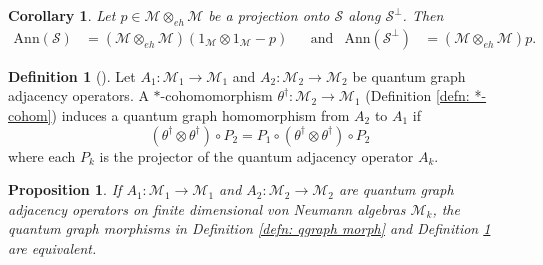 \documentclass[12pt]{article}
\newtheorem{corollary}[theorem]{Corollary}
\newtheorem{proposition}[theorem]{Proposition}
\theoremstyle{definition}
\newtheorem{definition}[theorem]{Definition}
\newcommand{\mc}[1]{\mathcal{#1}}
\newcommand{\<}{\langle}
\renewcommand{\>}{\rangle}
\newcommand{\Ann}{\text{Ann}}
\newcommand{\eh}{\otimes_{eh}}
\begin{document}
\begin{corollary} \label{cor: proj-ann}
    Let $p \in \mc M \eh \mc M$ be a projection onto $\mc S$ along $\mc S^\perp$. Then
    \begin{align*}
    \Ann(\mc S) &= (\mc M \eh \mc M)(1_{\mc M} \otimes 1_{\mc M} -p) &&\text{and} & \Ann(\mc S^\perp) &= (\mc M \eh \mc M)p.
    \end{align*}
\end{corollary}

\begin{definition}[] \label{defn: string morph}
    Let $A_1: \mc M_1 \to \mc M_1$ and $A_2: \mc M_2 \to \mc M_2$ be quantum graph adjacency operators. A $*$-cohomomorphism $\theta^\dagger: \mc M_2 \to \mc M_1$ (Definition \ref{defn: *-cohom}) induces a quantum graph homomorphism from $A_2$ to $A_1$ if 
    \[
    (\theta^\dagger \otimes \theta^\dagger) \circ P_{2} = P_{1} \circ (\theta^\dagger \otimes \theta^\dagger) \circ P_{2}
    \]
    where each $P_{k}$ is the projector of the quantum adjacency operator $A_k$.
\end{definition}

\begin{proposition} \label{thm: mrv-ann}
    If $A_1: \mc M_1 \to \mc M_1$ and $A_2: \mc M_2 \to \mc M_2$ are quantum graph adjacency operators on finite dimensional von Neumann algebras $\mc M_k$, the quantum graph morphisms in Definition \ref{defn: qgraph morph} and Definition \ref{defn: string morph} are equivalent. 
\end{proposition}
\end{document}
